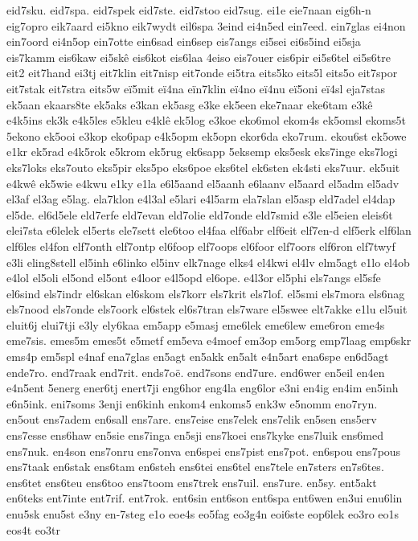 {eid7sku.
eid7spa.
eid7spek
eid7ste.
eid7stoo
eid7sug.
ei1e
eie7naan
eig6h-n
eig7opro
eik7aard
ei5kno
eik7wydt
eil6spa
3eind
ei4n5ed
ein7eed.
ein7glas
ei4non
ein7oord
ei4n5op
ein7otte
ein6sad
ein6sep
eis7angs
ei5sei
ei6s5ind
ei5sja
eis7kamm
eis6kaw
ei5skê
eis6kot
eis6laa
4eiso
eis7ouer
eis6pir
ei5s6tel
ei5s6tre
eit2
eit7hand
ei3tj
eit7klin
eit7nisp
eit7onde
ei5tra
eits5ko
eits5l
eits5o
eit7spor
eit7stak
eit7stra
eits5w
eï5mit
eï4na
eïn7klin
eï4no
eï4nu
eï5oni
eï4sl
eja7stas
ek5aan
ekaars8te
ek5aks
e3kan
ek5asg
e3ke
ek5een
eke7naar
eke6tam
e3kê
e4k5ins
ek3k
e4k5les
e5kleu
e4klê
ek5log
e3koe
eko6mol
ekom4s
ek5omsl
ekoms5t
5ekono
ek5ooi
e3kop
eko6pap
e4k5opm
ek5opn
ekor6da
eko7rum.
ekou6st
ek5owe
e1kr
ek5rad
e4k5rok
e5krom
ek5rug
ek6sapp
5eksemp
eks5esk
eks7inge
eks7logi
eks7loks
eks7outo
eks5pir
eks5po
eks6poe
eks6tel
ek6sten
ek4sti
eks7uur.
ek5uit
e4kwê
ek5wie
e4kwu
e1ky
e1la
e6l5aand
el5aanh
e6laanv
el5aard
el5adm
el5adv
el3af
el3ag
e5lag.
ela7klon
e4l3al
e5lari
e4l5arm
ela7slan
el5asp
eld7adel
el4dap
el5de.
el6d5ele
eld7erfe
eld7evan
eld7olie
eld7onde
eld7smid
e3le
el5eien
eleis6t
elei7sta
e6lelek
el5erts
ele7sett
ele6too
el4faa
elf6abr
elf6eit
elf7en-d
elf5erk
elf6lan
elf6les
el4fon
elf7onth
elf7ontp
el6foop
elf7oops
el6foor
elf7oors
elf6ron
elf7twyf
e3li
eling8stell
el5inh
e6linko
el5inv
elk7nage
elks4
el4kwi
el4lv
elm5agt
e1lo
el4ob
e4lol
el5oli
el5ond
el5ont
e4loor
e4l5opd
el6ope.
e4l3or
el5phi
els7angs
el5sfe
el6sind
els7indr
el6skan
el6skom
els7korr
els7krit
els7lof.
el5smi
els7mora
els6nag
els7nood
els7onde
els7oork
el6stek
el6s7tran
els7ware
el5swee
elt7akke
e1lu
el5uit
eluit6j
elui7tji
e3ly
ely6kaa
em5app
e5masj
eme6lek
eme6lew
eme6ron
eme4s
eme7sis.
emes5m
emes5t
e5metf
em5eva
e4moef
em3op
em5org
emp7laag
emp6skr
ems4p
em5spl
e4naf
ena7glas
en5agt
en5akk
en5alt
e4n5art
ena6spe
en6d5agt
ende7ro.
end7raak
end7rit.
ends7oë.
end7sons
end7ure.
end6wer
en5eil
en4en
e4n5ent
5energ
ener6tj
enert7ji
eng6hor
eng4la
eng6lor
e3ni
en4ig
en4im
en5inh
e6n5ink.
eni7soms
3enji
en6kinh
enkom4
enkoms5
enk3w
e5nomm
eno7ryn.
en5out
ens7adem
en6sall
ens7are.
ens7eise
ens7elek
ens7elik
en5sen
ens5erv
ens7esse
ens6haw
en5sie
ens7inga
en5sji
ens7koei
ens7kyke
ens7luik
ens6med
ens7nuk.
en4son
ens7onru
ens7onva
en6spei
ens7pist
ens7pot.
en6spou
ens7pous
ens7taak
en6stak
ens6tam
en6steh
ens6tei
ens6tel
ens7tele
en7sters
en7s6tes.
ens6tet
ens6teu
ens6too
ens7toom
ens7trek
ens7uil.
ens7ure.
en5sy.
ent5akt
en6teks
ent7inte
ent7rif.
ent7rok.
ent6sin
ent6son
ent6spa
ent6wen
en3ui
enu6lin
enu5sk
enu5st
e3ny
en-7steg
e1o
eoe4s
eo5fag
eo3g4n
eoi6ste
eop6lek
eo3ro
eo1s
eos4t
eo3tr
}
